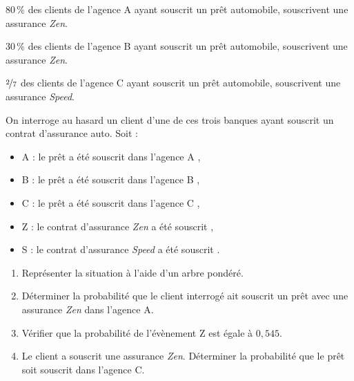 \documentclass[a4paper,11pt]{article}
\begin{document}
\medskip

\hspace{5mm}80\,\% des clients de l'agence A ayant souscrit un prêt automobile, souscrivent une assurance \emph{Zen}.

\hspace{5mm}30\,\% des clients de l'agence B ayant souscrit un prêt automobile, souscrivent une assurance \emph{Zen}.

\hspace{5mm}$\nicefrac{2}{7}$ des clients de l'agence C ayant souscrit un prêt automobile, souscrivent une assurance \emph{Speed}.

\smallskip 

On interroge au hasard un client d'une de ces trois banques ayant souscrit un contrat d'assurance auto. Soit :
%
\begin{itemize}[topsep=1pt]
	\item[] A : \og le prêt a été souscrit dans l'agence A \fg{},
	\item[] B : \og le prêt a été souscrit dans l'agence B \fg{},
	\item[] C : \og le prêt a été souscrit dans l'agence C \fg{}, 
	\item[] Z : \og le contrat d'assurance \emph{Zen} a été souscrit \fg{}, 
	\item[] S : \og le contrat d'assurance \emph{Speed} a été souscrit \fg{}.
\end{itemize}
%
\begin{enumerate}
	\item  Représenter la situation à l'aide d'un arbre pondéré. 
	\item Déterminer la probabilité que le client interrogé ait souscrit un prêt avec une assurance \emph{Zen} dans l'agence A. 
	\item Vérifier que la probabilité de l'évènement Z est égale à $0,545$. 
	\item Le client a souscrit une assurance \emph{Zen}. Déterminer la probabilité que le prêt soit souscrit dans l'agence C. 
\end{enumerate}
\end{document}
